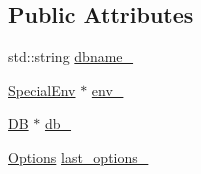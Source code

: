\subsection*{Public Attributes}
\begin{DoxyCompactItemize}
\item 
std\+::string \hyperlink{classleveldb_1_1_d_b_test_ab7eb9815f522ad154816d72d1cc23a86}{dbname\+\_\+}
\item 
\hyperlink{classleveldb_1_1_special_env}{Special\+Env} $\ast$ \hyperlink{classleveldb_1_1_d_b_test_a4525f680682885634a83434adf730e0e}{env\+\_\+}
\item 
\hyperlink{classleveldb_1_1_d_b}{D\+B} $\ast$ \hyperlink{classleveldb_1_1_d_b_test_acfaf0bf4afe62b306de8e37708b35fc5}{db\+\_\+}
\item 
\hyperlink{structleveldb_1_1_options}{Options} \hyperlink{classleveldb_1_1_d_b_test_adc05df912917d8de411d0672af04330f}{last\+\_\+options\+\_\+}
\end{DoxyCompactItemize}
